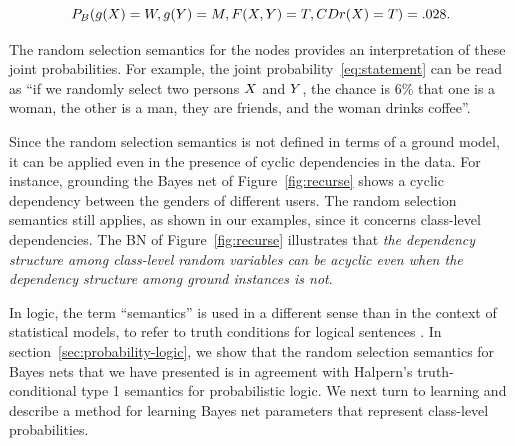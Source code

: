 \documentclass[oribibl]{llncs}
\begin{document}
\begin{equation}\label{eq:statement}
\textstyle P_{\B}(g(\X) = W, g(\Y)=M, F(\X,\Y)=T, CDr(\X)=T) = .028.  %
\end{equation}

The random selection semantics for the nodes provides an interpretation of these joint probabilities. 
For example, 
the joint probability~\eqref{eq:statement} can be read as ``if we randomly select two persons $X$ and $Y$, the chance is 6\% that one is a woman, the other is a man, they are friends, and the woman drinks coffee''.  

Since the random selection semantics is not defined in terms of a ground model, it can be applied even in the presence of cyclic dependencies in the data. For instance, grounding the Bayes net of Figure~\ref{fig:recurse} shows a cyclic dependency between the genders of different users. The random selection semantics still applies, as shown in our examples, since it concerns class-level dependencies. The BN of Figure~\ref{fig:recurse} illustrates that {\em the dependency structure among class-level random variables can be acyclic even when the dependency structure among ground instances is not}.

In logic, the term ``semantics'' is used in a different sense than in the context of statistical models, to refer to truth conditions for logical sentences \cite[Ch.7.4.2]{Russell2010}. In section~\ref{sec:probability-logic}, we show that the random selection semantics for Bayes nets that we have presented is in agreement with Halpern's truth-conditional type 1 semantics for probabilistic logic. We next turn to learning and describe a method for learning Bayes net parameters that represent class-level probabilities. 

\end{document}
